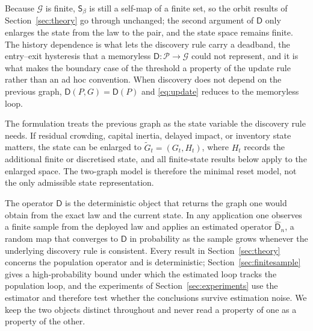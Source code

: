 \documentclass[11pt]{article}
\theoremstyle{plain}
\theoremstyle{definition}
\newcommand{\Pcal}{\mathcal{P}}
\newcommand{\Gcal}{\mathcal{G}}
\newcommand{\Dop}{\mathsf{D}}
\newcommand{\Dhat}{\widehat{\mathsf{D}}}
\newcommand{\Sbeta}{\mathsf{S}_\beta}
\begin{document}
Because $\Gcal$ is finite, $\Sbeta$ is still a self-map of a finite set, so the orbit results of Section~\ref{sec:theory} go through unchanged; the second argument of $\Dop$ only enlarges the state from the law to the pair, and the state space remains finite. The history dependence is what lets the discovery rule carry a deadband, the entry--exit hysteresis that a memoryless $\Dop:\Pcal\to\Gcal$ could not represent, and it is what makes the boundary case of the threshold a property of the update rule rather than an ad hoc convention. When discovery does not depend on the previous graph, $\Dop(P,G)=\Dop(P)$ and \eqref{eq:update} reduces to the memoryless loop.

The formulation treats the previous graph as the state variable the discovery rule needs. If residual crowding, capital inertia, delayed impact, or inventory state matters, the state can be enlarged to $\widetilde G_t=(G_t,H_t)$, where $H_t$ records the additional finite or discretised state, and all finite-state results below apply to the enlarged space. The two-graph model is therefore the minimal reset model, not the only admissible state representation.

The operator $\Dop$ is the deterministic object that returns the graph one would obtain from the exact law and the current state. In any application one observes a finite sample from the deployed law and applies an estimated operator $\Dhat_n$, a random map that converges to $\Dop$ in probability as the sample grows whenever the underlying discovery rule is consistent. Every result in Section~\ref{sec:theory} concerns the population operator and is deterministic; Section~\ref{sec:finitesample} gives a high-probability bound under which the estimated loop tracks the population loop, and the experiments of Section~\ref{sec:experiments} use the estimator and therefore test whether the conclusions survive estimation noise. We keep the two objects distinct throughout and never read a property of one as a property of the other.
\end{document}
